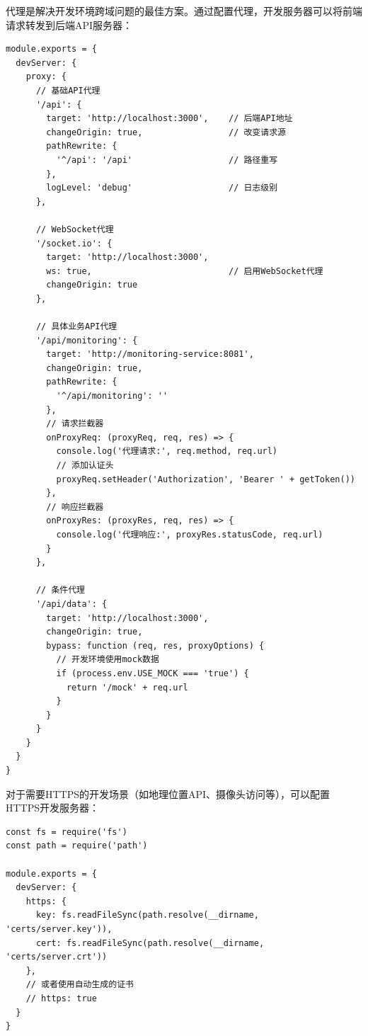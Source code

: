 
代理是解决开发环境跨域问题的最佳方案。通过配置代理，开发服务器可以将前端请求转发到后端API服务器：

\begin{lstlisting}[style=javascript]
module.exports = {
  devServer: {
    proxy: {
      // 基础API代理
      '/api': {
        target: 'http://localhost:3000',    // 后端API地址
        changeOrigin: true,                 // 改变请求源
        pathRewrite: {
          '^/api': '/api'                   // 路径重写
        },
        logLevel: 'debug'                   // 日志级别
      },
      
      // WebSocket代理
      '/socket.io': {
        target: 'http://localhost:3000',
        ws: true,                           // 启用WebSocket代理
        changeOrigin: true
      },
      
      // 具体业务API代理
      '/api/monitoring': {
        target: 'http://monitoring-service:8081',
        changeOrigin: true,
        pathRewrite: {
          '^/api/monitoring': ''
        },
        // 请求拦截器
        onProxyReq: (proxyReq, req, res) => {
          console.log('代理请求:', req.method, req.url)
          // 添加认证头
          proxyReq.setHeader('Authorization', 'Bearer ' + getToken())
        },
        // 响应拦截器
        onProxyRes: (proxyRes, req, res) => {
          console.log('代理响应:', proxyRes.statusCode, req.url)
        }
      },
      
      // 条件代理
      '/api/data': {
        target: 'http://localhost:3000',
        changeOrigin: true,
        bypass: function (req, res, proxyOptions) {
          // 开发环境使用mock数据
          if (process.env.USE_MOCK === 'true') {
            return '/mock' + req.url
          }
        }
      }
    }
  }
}
\end{lstlisting}


对于需要HTTPS的开发场景（如地理位置API、摄像头访问等），可以配置HTTPS开发服务器：

\begin{lstlisting}[style=javascript]
const fs = require('fs')
const path = require('path')

module.exports = {
  devServer: {
    https: {
      key: fs.readFileSync(path.resolve(__dirname, 'certs/server.key')),
      cert: fs.readFileSync(path.resolve(__dirname, 'certs/server.crt'))
    },
    // 或者使用自动生成的证书
    // https: true
  }
}
\end{lstlisting}

